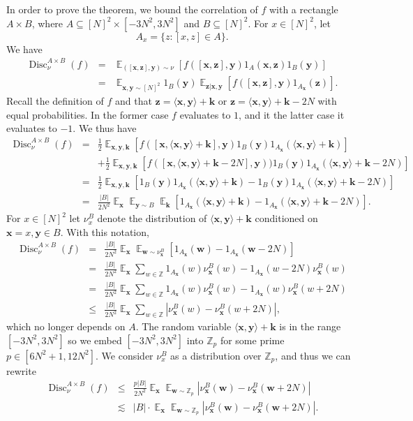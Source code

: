 \documentclass[11pt]{article}
\numberwithin{equation}{section}
\theoremstyle{definition}
\theoremstyle{plain}
\newcommand{\Z}{\mathbb Z}
\theoremstyle{definition}\newtheorem{problem}[theorem]{Problem}\theoremstyle{plain}
\DeclareMathOperator{\Ex}{{\mathbb E}}
\DeclareMathOperator{\Disc}{Disc}
\newcommand{\x}{\mathbf{x}}
\newcommand{\y}{\mathbf{y}}
\newcommand{\w}{\mathbf{w}}
\newcommand{\z}{\mathbf{z}}
\newcommand{\Bk}{\mathbf{k}}   %
\newcommand{\ip}[1]{\langle #1 \rangle}
\begin{document}
In order to prove the theorem, we bound the correlation of $f$ with a rectangle $A \times B$, where  $A \subseteq [N]^2 \times  [- 3N^2, 3N^2]$ and $B \subseteq [N]^2$. For $x \in [N]^2$, let
$$A_x=\{z: [x,z] \in A\}.$$
We have
\begin{eqnarray*}
\Disc^{A \times B}_\nu(f) &=&   \Ex_{([\x,\z], \y) \sim \nu}  \left[ f([\x,\z],\y) 1_{A}(\x,\z)1_B(\y) \right] \\
	&=&  \Ex_{\x,\y \sim [N]^2} 1_B(\y)   \Ex_{\z|\x,\y}  \left[ f([\x,\z],\y) 1_{A_\x}(\z) \right].
 \end{eqnarray*}
 Recall the definition of $f$ and that $\z=\ip{\x,\y}+\Bk$ or $\z=\ip{\x,\y}+\Bk-2N$ with equal probabilities. In the former
 case $f$ evaluates to $1$, and it the latter case it evaluates to $-1$.
 We thus have
 \begin{eqnarray*}
\Disc^{A \times B}_\nu(f) &=&   \frac{1}{2} \Ex_{\x,\y,\Bk } \left[   f([\x,\ip{\x,\y}+\Bk],\y)  1_B(\y) 1_{A_\x}(\ip{\x,\y}+\Bk) \right] \\
 &&   +  \frac{1}{2} \Ex_{\x,\y,\Bk } \left[    f([\x,\ip{\x,\y}+\Bk-2N],\y) )  1_B(\y) 1_{A_\x}(\ip{\x,\y}+\Bk-2N)\right] \\
 &=&  \frac{1}{2} \Ex_{\x,\y,\Bk}  \left[ 1_B(\y)  1_{A_\x}(\ip{\x,\y}+\Bk)-  1_B(\y)  1_{A_\x}(\ip{\x,\y}+\Bk-2N) \right] \\
	 &=& \frac{|B|}{2N^2} \Ex_\x \Ex_{\y \sim B}\Ex_\Bk \left[ 1_{A_\x}(\ip{\x,\y}+\Bk)-     1_{A_\x}(\ip{\x,\y}+\Bk-2N) \right].
\end{eqnarray*}
For $x \in [N]^2$ let $\nu^B_x$ denote the distribution of $\ip{\x,\y}+\Bk$ conditioned on $\x = x, \y \in B$.  With this notation,
%
\begin{eqnarray*}
 \Disc^{A \times B}_\nu(f) &=& \frac{|B|}{2N^2} \Ex_\x \Ex_{\w \sim \nu^B_\x} \left[  1_{A_\x}(\w)- 1_{A_\x}(\w-2N) \right] \\
  &= & \frac{|B|}{2N^2} \Ex_\x  \sum_{w \in \Z} 1_{A_\x}(w) \nu_{\x}^B(w) - 1_{A_\x}(w-2N)   \nu_{\x}^B(w)  \\
  &=&  \frac{|B|}{2N^2} \Ex_\x  \sum_{w \in \Z} 1_{A_\x}(w) \nu_{\x}^B(w) - 1_{A_\x}(w)  \nu_{\x}^B(w+2N) \\
  & \le &  \frac{|B|}{2N^2}   \Ex_\x  \sum_{w \in \Z} \left|\nu_{\x}^B(w) -\nu_{\x}^B(w+2N)\right|,
  \end{eqnarray*}
	which no longer depends on $A$.  The random variable $\ip{\x,\y}+\Bk$ is in the range $[-3N^2,3N^2]$ so we embed $[-3N^2,3N^2]$ into $\Z_p$ for some prime $ p\in [6N^2+1,12N^2]$. We consider $\nu_x^B$ as a distribution over $\Z_p$, and thus we can rewrite
\begin{eqnarray*}
\label{eq:DiscSimplified}
	\Disc^{A \times B}_\nu(f) &\leq&  \frac{p |B| }{2N^2}   \Ex_\x  \Ex_{\w \sim \Z_p} |\nu_{\x}^B(\w) -\nu_{\x}^B(\w+2N)| \\
	&\lesssim& |B|\cdot \Ex_\x  \Ex_{\w \sim \Z_p} |\nu_{\x}^B(\w) -\nu_{\x}^B(\w+2N)|.
 \end{eqnarray*}
\end{document}
